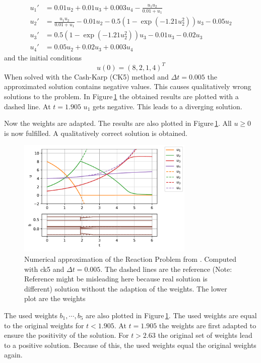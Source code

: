 \documentclass[a4paper]{scrartcl}
\numberwithin{equation}{section}
\theoremstyle{plain}
\theoremstyle{definition}
\numberwithin{theorem}{section}
\newcommand{\dt}{{\Delta t}}
\newcommand{\1}{\mathbbm{1}}
\begin{document}
\begin{subequations}
\label{eq:Reaction}
\begin{align}
u_1' &= 0.01u_2 + 0.01 u_3 +0.003u_4 - \frac{u_1 u_2}{0.01+u_1} \\ 
u_2' &= \frac{u_1u_2}{0.01+u_1}-0.01 u_2-0.5(1-\exp(-1.21 u_2^2)) u_3 -0.05 u_2 \\ 
u_3' &= 0.5(1-\exp(-1.21u_2^2)) u_3 - 0.01 u_3 -0.02 u_3 \\ 
u_4' &=0.05 u_2 + 0.02 u_3 + 0.003u_4 
\end{align}
\end{subequations}
and the initial conditions
\begin{equation}
u(0) = (8,2,1,4)^T
\end{equation}
When solved with the Cash-Karp (CK5) method and $\dt = 0.005$ the approximated solution contains negative values. This causes qualitatively wrong solutions to the problem. 
In Figure\,\ref{fig:exampleI} the obtained results are plotted with a dashed line. 
At $t=1.905$ $u_1$ gets negative. This leads to a diverging solution.

Now the weights are adapted. The results are also plotted in Figure\,\ref{fig:exampleI}. 
All $u\geq0$ is now fulfilled. A qualitatively correct solution is obtained.

\begin{figure}[h]
    \centering
    \includegraphics[width=0.75\textwidth]{plots/exampleI.pdf}
    \caption{Numerical approximation of the Reaction Problem from \cite{kopecz_comparison_2019}. Computed with ck5 and $\dt = 0.005$. The dashed lines are the reference (Note: Reference might be misleading here because real solution is different) solution without the adaption of the weights. The lower plot are the weights }
    \label{fig:exampleI}
\end{figure}

The used weights $b_1,\cdots,b_5$ are also plotted in Figure\,\ref{fig:exampleI}. 
The used weights are equal to the original weights for $t<1.905$. At $t=1.905$ the weights are first adapted to ensure the positivity of the solution. For $t>2.63$ the original set of weights lead to a positive solution. Because of this, the used weights equal the original weights again.
\end{document}
